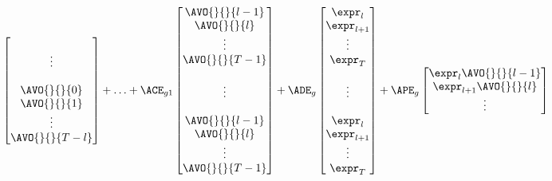 \begin{equation}
\begin{aligned}
\begin{bmatrix}
            \\
            \vdots
            \\
            \\
            \AVO{}{}{0}
            \\
            \AVO{}{}{1}
            \\
            \vdots
            \\
            \AVO{}{}{T-l}
        \end{bmatrix}
        +
        \ldots
        + \ACE_{g1}
        \begin{bmatrix}
            \AVO{}{}{l-1}
            \\
            \AVO{}{}{l}
            \\
            \vdots
            \\
            \AVO{}{}{T-1}
            \\
            \\
            \vdots
            \\
            \\
            \AVO{}{}{l-1}
            \\
            \AVO{}{}{l}
            \\
            \vdots
            \\
            \AVO{}{}{T-1}
        \end{bmatrix}
        + \ADE_g 
        \begin{bmatrix}
            \expr_{l}
            \\
            \expr_{l+1}
            \\
            \vdots
            \\
            \expr_{T}
            \\
            \\
            \vdots
            \\
            \\
            \expr_{l}
            \\
            \expr_{l+1}
            \\
            \vdots
            \\
            \expr_{T}
        \end{bmatrix}
        + \APE_g  
        \begin{bmatrix}
            \expr_{l}\AVO{}{}{l-1}
            \\
            \expr_{l+1}\AVO{}{}{l}
            \\
            \vdots

\end{bmatrix}
\end{aligned}
\end{equation}
